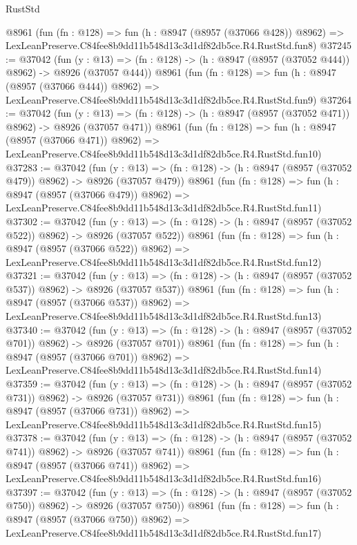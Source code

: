 \begin{lexlean}{RustStd}
\begin{coremodule}
    @8961
    (fun (fn : @128) =>
    fun (h : @8947 (@8957 (@37066 @428)) @8962) =>
    LexLeanPreserve.C84fee8b9dd11b548d13c3d1df82db5ce.R4.RustStd.fun8)
@37245 := @37042
    (fun (y : @13) => (fn : @128) -> (h : @8947 (@8957 (@37052 @444)) @8962) -> @8926 (@37057 @444))
    @8961
    (fun (fn : @128) =>
    fun (h : @8947 (@8957 (@37066 @444)) @8962) =>
    LexLeanPreserve.C84fee8b9dd11b548d13c3d1df82db5ce.R4.RustStd.fun9)
@37264 := @37042
    (fun (y : @13) => (fn : @128) -> (h : @8947 (@8957 (@37052 @471)) @8962) -> @8926 (@37057 @471))
    @8961
    (fun (fn : @128) =>
    fun (h : @8947 (@8957 (@37066 @471)) @8962) =>
    LexLeanPreserve.C84fee8b9dd11b548d13c3d1df82db5ce.R4.RustStd.fun10)
@37283 := @37042
    (fun (y : @13) => (fn : @128) -> (h : @8947 (@8957 (@37052 @479)) @8962) -> @8926 (@37057 @479))
    @8961
    (fun (fn : @128) =>
    fun (h : @8947 (@8957 (@37066 @479)) @8962) =>
    LexLeanPreserve.C84fee8b9dd11b548d13c3d1df82db5ce.R4.RustStd.fun11)
@37302 := @37042
    (fun (y : @13) => (fn : @128) -> (h : @8947 (@8957 (@37052 @522)) @8962) -> @8926 (@37057 @522))
    @8961
    (fun (fn : @128) =>
    fun (h : @8947 (@8957 (@37066 @522)) @8962) =>
    LexLeanPreserve.C84fee8b9dd11b548d13c3d1df82db5ce.R4.RustStd.fun12)
@37321 := @37042
    (fun (y : @13) => (fn : @128) -> (h : @8947 (@8957 (@37052 @537)) @8962) -> @8926 (@37057 @537))
    @8961
    (fun (fn : @128) =>
    fun (h : @8947 (@8957 (@37066 @537)) @8962) =>
    LexLeanPreserve.C84fee8b9dd11b548d13c3d1df82db5ce.R4.RustStd.fun13)
@37340 := @37042
    (fun (y : @13) => (fn : @128) -> (h : @8947 (@8957 (@37052 @701)) @8962) -> @8926 (@37057 @701))
    @8961
    (fun (fn : @128) =>
    fun (h : @8947 (@8957 (@37066 @701)) @8962) =>
    LexLeanPreserve.C84fee8b9dd11b548d13c3d1df82db5ce.R4.RustStd.fun14)
@37359 := @37042
    (fun (y : @13) => (fn : @128) -> (h : @8947 (@8957 (@37052 @731)) @8962) -> @8926 (@37057 @731))
    @8961
    (fun (fn : @128) =>
    fun (h : @8947 (@8957 (@37066 @731)) @8962) =>
    LexLeanPreserve.C84fee8b9dd11b548d13c3d1df82db5ce.R4.RustStd.fun15)
@37378 := @37042
    (fun (y : @13) => (fn : @128) -> (h : @8947 (@8957 (@37052 @741)) @8962) -> @8926 (@37057 @741))
    @8961
    (fun (fn : @128) =>
    fun (h : @8947 (@8957 (@37066 @741)) @8962) =>
    LexLeanPreserve.C84fee8b9dd11b548d13c3d1df82db5ce.R4.RustStd.fun16)
@37397 := @37042
    (fun (y : @13) => (fn : @128) -> (h : @8947 (@8957 (@37052 @750)) @8962) -> @8926 (@37057 @750))
    @8961
    (fun (fn : @128) =>
    fun (h : @8947 (@8957 (@37066 @750)) @8962) =>
    LexLeanPreserve.C84fee8b9dd11b548d13c3d1df82db5ce.R4.RustStd.fun17)

\end{coremodule}
\end{lexlean}
